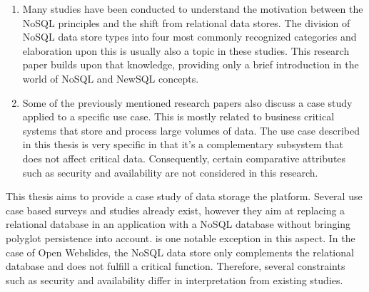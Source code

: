 \begin{enumerate}
  \item Many studies have been conducted to understand the motivation between the NoSQL principles and the shift from relational data stores.
        The division of NoSQL data store types into four most commonly recognized categories and elaboration upon this is usually also a topic in these studies.
        This research paper builds upon that knowledge, providing only a brief introduction in the world of NoSQL and NewSQL concepts.
  \item Some of the previously mentioned research papers also discuss a case study applied to a specific use case.
        This is mostly related to business critical systems that store and process large volumes of data.
        The use case described in this thesis is very specific in that it's a complementary subsystem that does not affect critical data.
        Consequently, certain comparative attributes such as security and availability are not considered in this research.
\end{enumerate}


This thesis aims to provide a case study of data storage the \textcite{OpenWebslides2017} platform.
Several use case based surveys and studies already exist, however they aim at replacing a relational database in an application with a NoSQL database without bringing polyglot persistence into account.
\textcite{Sadalage2012} is one notable exception in this aspect.
In the case of Open Webslides, the NoSQL data store only complements the relational database and does not fulfill a critical function.
Therefore, several constraints such as security and availability differ in interpretation from existing studies.
